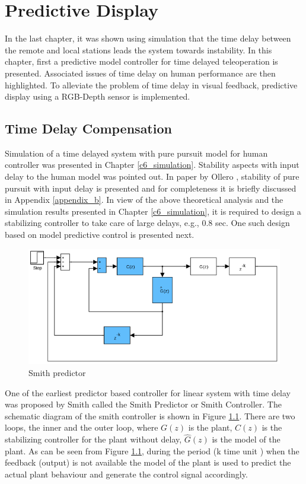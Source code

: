\chapter{ Predictive Display}
\label{ch_7:PDsply}
In the last chapter, it was shown using simulation that the time delay between the remote and local stations leads the system towards instability. In this chapter, first a predictive model controller for time delayed teleoperation is presented. Associated issues of time delay on human performance are then highlighted. To alleviate the problem of time delay in visual feedback, predictive display using a RGB-Depth sensor is  implemented.

\section {Time Delay Compensation}
Simulation of a time delayed system with pure pursuit model for human controller was presented in Chapter \ref{c6_simulation}.  Stability aspects with input delay to the human model was pointed out. In paper by Ollero \cite{ollero1995stability}, stability of pure pursuit with input delay is presented and for completeness it is briefly discussed in Appendix \ref{appendix_b}.   In view of the above theoretical analysis and the simulation results presented in Chapter \ref{c6_simulation}, it is required to design  a stabilizing controller to take care of large delays, e.g.,  0.8 sec. One such design based on model  predictive control is presented next.

 \begin{figure}
 	\includegraphics[width=\linewidth]{Chapter7/fig/Smith_predictor}
 	\caption{Smith predictor \cite{smith1959controller}}
 	\label{fig:Smith}
 \end{figure}
 
 One of the earliest predictor based controller for linear system with time delay  was proposed by Smith \cite{smith1959controller} called the Smith Predictor or Smith Controller. The schematic diagram of the smith controller is shown in Figure \ref{fig:Smith}. There are two loops, the inner and the outer loop, where $G(z)$ is the plant, $C(z)$ is the stabilizing controller  for the plant without delay, $\hat{G}(z)$ is the model of the plant.  As can be seen from  Figure \ref{fig:Smith}, during the period (k time unit ) when the feedback (output) is not available the model of the plant is used to predict the actual plant behaviour and generate the control signal accordingly. 
 
